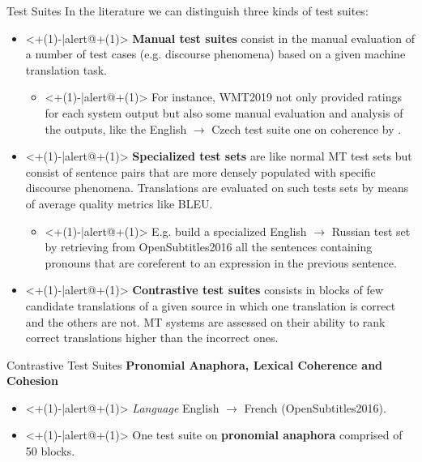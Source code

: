 \begin{frame}{Test Suites}\label{fr:test_suites_intro}
	In the literature we can distinguish three kinds of test suites:
	\begin{itemize}
		\item<+(1)-|alert@+(1)> \textbf{Manual test suites} consist in the manual evaluation of a number of test cases (e.g. discourse phenomena) based on a given machine translation task.
		\begin{itemize}
			\item<+(1)-|alert@+(1)> For instance, WMT2019 not only provided ratings for each system output but also some manual evaluation and analysis of the outputs, like the English $\rightarrow$ Czech test suite one on coherence by \cite{rysova_test_2019}.
		\end{itemize}
		\item<+(1)-|alert@+(1)> \textbf{Specialized test sets} are like normal MT test sets but consist of sentence pairs that are more densely populated with specific discourse phenomena. Translations are evaluated on such tests sets by means of average quality metrics like BLEU.
		\begin{itemize}
			\item<+(1)-|alert@+(1)> E.g. \cite{voita_context-aware_2018} build a specialized English $\rightarrow$ Russian test set by retrieving from OpenSubtitles2016 all the sentences containing pronouns that are coreferent to an expression in the previous sentence.
		\end{itemize}
		\item<+(1)-|alert@+(1)> \textbf{Contrastive test suites} consists in blocks of few candidate translations of a given source in which one translation is correct and the others are not. MT systems are assessed on their ability to rank correct translations higher than the incorrect ones.   
	\end{itemize}
\end{frame}

\begin{frame}{Contrastive Test Suites}
	\textbf{Pronomial Anaphora, Lexical Coherence and Cohesion} \cite{bawden_evaluating_2018}
	\begin{itemize}
		\item<+(1)-|alert@+(1)> \textit{Language} English $\rightarrow$ French (OpenSubtitles2016).
		\item<+(1)-|alert@+(1)> One test suite on \textbf{pronomial anaphora} comprised of 50 blocks.
	\end{itemize}
\end{frame}

